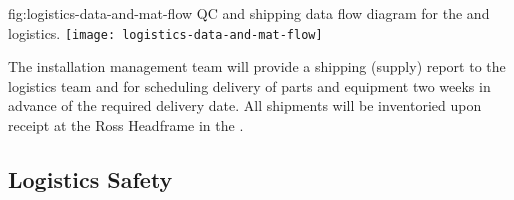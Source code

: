  


\begin{dunefigure}{fig:logistics-data-and-mat-flow}
  {QC and shipping data flow diagram for the  and  logistics.}
 \texttt{[image: logistics-data-and-mat-flow]}
\end{dunefigure}

 
The  installation management team will provide a shipping (supply) report to the  logistics team and  for scheduling delivery of parts and equipment two weeks in advance of the required delivery date. 
All shipments will be inventoried upon receipt at the Ross Headframe in the . 




\subsection{Logistics Safety}
\label{sec:fdsp-tc-log-safety}


